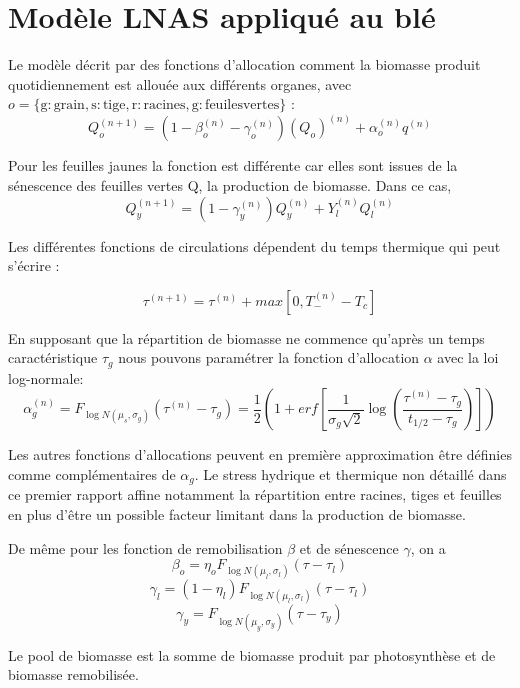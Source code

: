 \section{Modèle LNAS appliqué au blé}
Le modèle décrit par des fonctions d'allocation comment la biomasse produit quotidiennement est allouée aux différents organes, avec $o = \{\mathrm{g:grain, s:tige, r:racines, g:feuiles vertes}\} $ :
\[ {Q_o^{(n+1)}} = (1-\beta_o^{(n)}-\gamma_o^{(n)} )(Q_o)^{(n)} +\alpha_o^{(n)}q^{(n)} \]

Pour les feuilles jaunes la fonction est différente car elles sont issues de la sénescence des feuilles vertes Q, la production de biomasse. 
Dans ce cas, 
\[ {Q_y^{(n+1)}}=(1-\gamma_y^{(n)})Q_y^{(n)}+Y_l^{(n)}Q_l^{(n)} \]

Les différentes fonctions de circulations dépendent du temps thermique qui peut s'écrire :

\[ {\tau}^{(n+1)}=\tau^{(n)}+max[0,T_-^{(n)}-T_c] \]

En supposant que la répartition de biomasse ne commence qu'après un temps caractéristique $\tau_g$ nous pouvons paramétrer la fonction d'allocation $\alpha$ avec la loi log-normale:
\[ {\alpha_g^{(n)}}=F_{\log N(\mu_s,\sigma_g)}(\tau^{(n)}-\tau_g)=\frac{1}{2} (1+erf[\frac{1}{\sigma_g \sqrt{2}}\log (\frac{\tau^{(n)}-\tau_g}{t_{1/2}-\tau_g})]) \]

Les autres fonctions d'allocations peuvent en première approximation être définies comme complémentaires de $\alpha_g$. Le stress hydrique et thermique non détaillé dans ce premier rapport affine notamment la répartition entre racines, tiges et feuilles en plus d'être un possible facteur limitant dans la production de biomasse.

De même pour les fonction de remobilisation $\beta $ et de sénescence $\gamma$, on a
\[ {\beta_o}=\eta_o F_{\log N(\mu_l, \sigma_l)}(\tau-\tau_l) \]
\[ {\gamma_l}=(1-\eta_l)F_{\log N(\mu_l, \sigma_l)}(\tau-\tau_l) \]
\[ {\gamma_y}=F_{\log N(\mu_y, \sigma_y)}(\tau-\tau_y) \]

Le pool de biomasse est la somme de biomasse produit par photosynthèse et de biomasse remobilisée.


